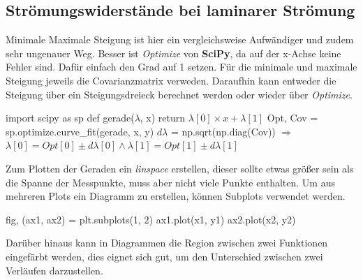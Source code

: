 \documentclass[a4paper,12pt]{article}
\begin{document}
\setcounter{subsection}{1}
\subsection{Strömungswiderstände bei laminarer Strömung}
Minimale Maximale Steigung ist hier ein vergleichsweise Aufwändiger und zudem sehr ungenauer Weg. 
Besser ist \textit{Optimize} von \textbf{SciPy}, da auf der x-Achse keine Fehler sind. Dafür einfach den Grad auf 1 setzen.
Für die minimale und maximale Steigung jeweils die Covarianzmatrix verweden. \newline
Daraufhin kann entweder die Steigung über ein Steigungsdreieck berechnet werden oder wieder über \textit{Optimize}.
\begin{center}
\begin{tcolorbox}[colback=gray!20, colframe=black, width=1\textwidth, boxrule=1pt, arc=1mm]
import scipy as sp \newline
def gerade($\lambda$, x) \newline
\hspace*{1cm} return $\lambda[0] \times x + \lambda[1]$ \newline
Opt, Cov = sp.optimize.curve\_fit(gerade, x, y) \newline
$d\lambda$ = np.sqrt(np.diag(Cov)) \newline
$\Rightarrow$ \newline
$\lambda[0] = Opt[0] \pm d\lambda[0] \land \lambda[1] = Opt[1] \pm d\lambda[1] $
\end{tcolorbox}
\end{center}
Zum Plotten der Geraden ein \textit{linspace} erstellen, dieser sollte etwas größer sein als die Spanne der Messpunkte, muss aber nicht viele Punkte enthalten.\newline
Um aus mehreren Plots ein Diagramm zu erstellen, können Subplots verwendet werden.
\begin{center}
\begin{tcolorbox}[colback=gray!20, colframe=black, width=1\textwidth, boxrule=1pt, arc=1mm]
fig, (ax1, ax2) = plt.subplots(1, 2) \newline
ax1.plot(x1, y1) \newline
ax2.plot(x2, y2)
\end{tcolorbox}
\end{center}
Darüber hinaus kann in Diagrammen die Region zwischen zwei Funktionen eingefärbt werden, dies eignet sich gut, um den Unterschied zwischen zwei Verläufen darzustellen.
\end{document}
